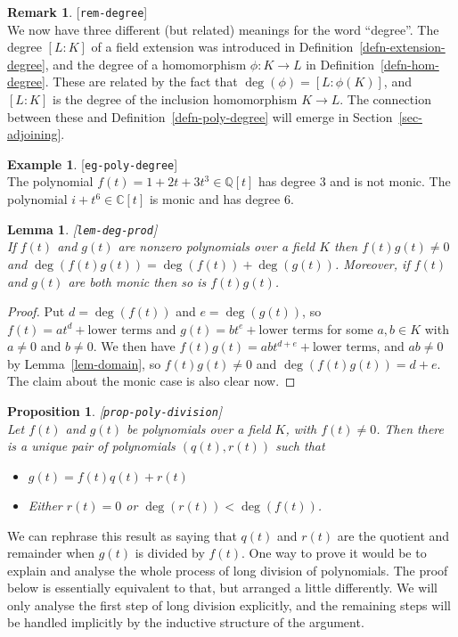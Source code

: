 \documentclass{amsart}
\newcommand{\lbl}[1]{\label{#1}\textup{[\texttt{#1}]}\ \\}
\newcommand{\lbl}{\label}
\newcommand{\Q}         {{\mathbb{Q}}}
\newcommand{\C}         {{\mathbb{C}}}
\renewcommand{\:}{\colon}
\newtheorem{lemma}[theorem]{Lemma}
\newtheorem{proposition}[theorem]{Proposition}
\theoremstyle{definition}
\newtheorem{remark}[theorem]{Remark}
\newtheorem{example}[theorem]{Example}
\begin{document}
\begin{remark}\lbl{rem-degree}
 We now have three different (but related) meanings for the word
 ``degree''.  The degree $[L:K]$ of a field extension was introduced
 in Definition~\ref{defn-extension-degree}, and the degree of a
 homomorphism $\phi\:K\to L$ in Definition~\ref{defn-hom-degree}.
 These are related by the fact that $\deg(\phi)=[L:\phi(K)]$, and
 $[L:K]$ is the degree of the inclusion homomorphism $K\to L$.  The
 connection between these and Definition~\ref{defn-poly-degree} will
 emerge in Section~\ref{sec-adjoining}.
\end{remark}

\begin{example}\lbl{eg-poly-degree}
 The polynomial $f(t)=1+2t+3t^3\in\Q[t]$ has degree $3$ and is not
 monic.  The polynomial $i+t^6\in\C[t]$ is monic and has degree $6$.   
\end{example}

\begin{lemma}\lbl{lem-deg-prod}
 If $f(t)$ and $g(t)$ are nonzero polynomials over a field $K$ then
 $f(t)g(t)\neq 0$ and $\deg(f(t)g(t))=\deg(f(t))+\deg(g(t))$.
 Moreover, if $f(t)$ and $g(t)$ are both monic then so is $f(t)g(t)$. 
\end{lemma}
\begin{proof}
 Put $d=\deg(f(t))$ and $e=\deg(g(t))$, so
 $f(t)=at^d+\text{lower terms}$ and $g(t)=bt^e+\text{lower terms}$ for
 some $a,b\in K$ with $a\neq 0$ and $b\neq 0$.  We then have
 $f(t)g(t)=abt^{d+e}+\text{lower terms}$, and $ab\neq 0$ by
 Lemma~\ref{lem-domain}, so $f(t)g(t)\neq 0$ and
 $\deg(f(t)g(t))=d+e$.  The claim about the monic case is also clear
 now. 
\end{proof}

\begin{proposition}\lbl{prop-poly-division}
 Let $f(t)$ and $g(t)$ be polynomials over a field $K$, with
 $f(t)\neq 0$.  Then there is a unique pair of polynomials
 $(q(t),r(t))$ such that  
 \begin{itemize}
  \item $g(t)=f(t)q(t)+r(t)$
  \item Either $r(t)=0$ or $\deg(r(t))<\deg(f(t))$.
 \end{itemize}
\end{proposition}

We can rephrase this result as saying that $q(t)$ and $r(t)$ are the
quotient and remainder when $g(t)$ is divided by $f(t)$.  One way to
prove it would be to explain and analyse the whole process of long
division of polynomials.  The proof below is essentially equivalent to
that, but arranged a little differently.  We will only analyse the
first step of long division explicitly, and the remaining steps will
be handled implicitly by the inductive structure of the argument.
\end{document}
